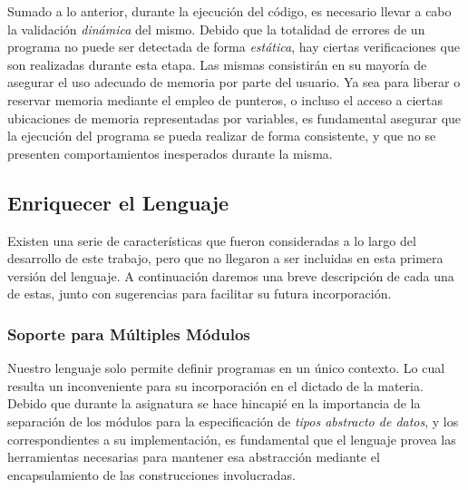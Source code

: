 Sumado a lo anterior, durante la ejecución del código, es necesario llevar a cabo la validación \textit{dinámica} del mismo.
Debido que la totalidad de errores de un programa no puede ser detectada de forma \textit{estática}, hay ciertas verificaciones que son realizadas durante esta etapa.
Las mismas consistirán en su mayoría de asegurar el uso adecuado de memoria por parte del usuario.
Ya sea para liberar o reservar memoria mediante el empleo de punteros, o incluso el acceso a ciertas ubicaciones de memoria representadas por variables, es fundamental asegurar que la ejecución del programa se pueda realizar de forma consistente, y que no se presenten comportamientos inesperados durante la misma.
\fi

\subsection{Enriquecer el Lenguaje}

Existen una serie de características que fueron consideradas a lo largo del desarrollo de este trabajo, pero que no llegaron a ser incluidas en esta primera versión del lenguaje.
A continuación daremos una breve descripción de cada una de estas, junto con sugerencias para facilitar su futura incorporación.

\subsubsection{Soporte para Múltiples Módulos}

Nuestro lenguaje solo permite definir programas en un único contexto.
Lo cual resulta un inconveniente para su incorporación en el dictado de la materia.
Debido que durante la asignatura se hace hincapié en la importancia de la separación de los módulos para la especificación de \textit{tipos abstracto de datos}, y los correspondientes a su implementación, es fundamental que el lenguaje provea las herramientas necesarias para mantener esa abstracción mediante el encapsulamiento de las construcciones involucradas.


